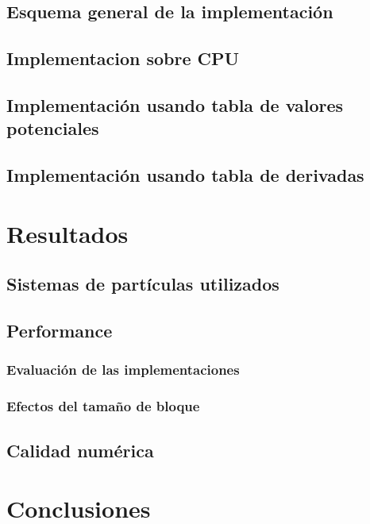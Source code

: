 \documentclass[a4paper,10pt]{report}
\begin{document}
\section{Esquema general de la implementación}
\section{Implementacion sobre CPU}
\section{Implementación usando tabla de valores potenciales}
\section{Implementación usando tabla de derivadas}


\chapter{Resultados}
\section{Sistemas de partículas utilizados}
\section{Performance}
\subsection{Evaluación de las implementaciones}
\subsection{Efectos del tamaño de bloque}
\section{Calidad numérica}

\chapter{Conclusiones}
\end{document}
